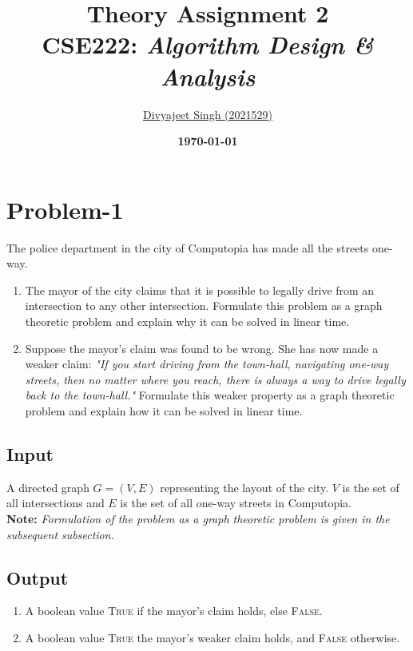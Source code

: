 \documentclass[12pt]{report}
\title{
    \textbf{\Huge{Theory Assignment 2}} \\
    \vspace*{15pt}
    \large{CSE222: \textit{Algorithm Design \& Analysis}}
}
\author{
    \href{mailto:divyajeet21529@iiitd.ac.in}{Divyajeet Singh (2021529)}
}
\date{
    \vspace*{10pt}
    \textbf{\today}
}
\begin{document}
    \maketitle

    \section*{\huge{Problem-1}}
    The police department in the city of Computopia has made all the streets one-way.
    \begin{enumerate}[label=(\alph*)]
        \item
        The mayor of the city claims that it is possible to legally drive from an intersection to any other intersection.
        Formulate this problem as a graph theoretic problem and explain why it can be solved in linear time.
        \item
        Suppose the mayor's claim was found to be wrong. She has now made a weaker claim:
        \textit{"If you start driving from the town-hall, navigating one-way streets, then no matter where you reach,
        there is always a way to drive legally back to the town-hall."}
        Formulate this weaker property as a graph theoretic problem and explain how it can be solved in linear time.
    \end{enumerate}

    \subsection*{Input}
    A directed graph $G = (V, E)$ representing the layout of the city.
    $V$ is the set of all intersections and $E$ is the set of all one-way streets in Computopia.
    \vspace*{7.5pt} \\
    \textbf{Note:} \textit{Formulation of the problem as a graph theoretic problem is given in the subsequent subsection.}

    \subsection*{Output}
    \begin{enumerate}[label=(\textbf{\alph*})]
        \item A boolean value \textsc{True} if the mayor's claim holds, else \textsc{False}.
        \item A boolean value \textsc{True} the mayor's weaker claim holds, and \textsc{False} otherwise.
    \end{enumerate}
\end{document}
